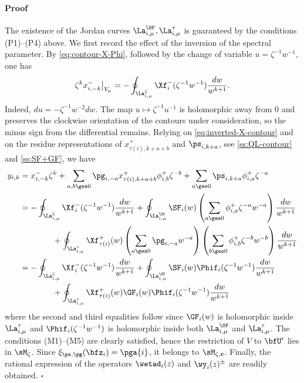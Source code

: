 \documentclass[reqno]{amsart}
\numberwithin{equation}{section}
\newenvironment{pf}{\medskip\paragraph{{\sc Proof}}}{\hfill$\square$\par\medskip}
\begin{document}
\begin{pf}
	The existence of the Jordan curves $\La^\SF_{i,\mu}, \La^\tau_{i,\mu}$ is guaranteed by the conditions (P1)--(P4) above.
	We first record the effect of the inversion of the spectral
	parameter. By \eqref{eq:contour-X-Phi}, followed by the change of
	variable $u=\zeta^{-1}w^{-1}$, one has
	\begin{equation}\label{eq:inverted-X-contour}
		\zeta^k x^-_{i,-k}\big|_{V_\mu}
		=
		-\oint_{\La^\zeta_{i,\mu}}
		\Xf_i^-(\zeta^{-1}w^{-1})\frac{dw}{w^{k+1}}.
	\end{equation}
	Indeed, $du=-\zeta^{-1}w^{-2}dw$. The map
	$u\mapsto\zeta^{-1}u^{-1}$ is holomorphic away from $0$ and
	preserves the clockwise orientation of the contours under
	consideration, so the minus sign from the differential remains.
	Relying on \eqref{eq:inverted-X-contour} and on the residue
	representations of $x^+_{\tau(i),k+a+b}$ and $\ps_{i,k+a}$, see
	\ref{ss:QL-contour} and \ref{ss:SF+GF}, we have
	\begin{align}
	y_{i,k}&=x_{i,-k}^-\zeta^k
+\sum_{a,b\ges0}\pg_{i,-a}x^+_{\tau(i),k+a+b}\phi^+_{i,b}\zeta^{-b}
+\sum_{a\ges0}\ps_{i,k+a}\phi^+_{i,a}\zeta^{-a}\\
	&=-\oint_{\La_{i,\mu}^\zeta}\Xf^-_{i}(\zeta^{-1}w^{-1})\frac{dw}{w^{k+1}}
+\oint_{\La_{i,\mu}^\SF}\SF_i(w)\left(\sum_{a\ges0}\phi_{i,a}^+\zeta^{-a}w^{-a}\right)\frac{dw}{w^{k+1}}\\
&\qquad\qquad+\oint_{\La_{i,\mu}^{\tau}}\Xf_{\tau(i)}^+(w)\left(\sum_{a\ges0}\pg_{i,-a}w^{-a}\right)\left(\sum_{b\ges0}\phi^+_{i,b}\zeta^{-b}w^{-b}\right)\frac{dw}{w^{k+1}}\\
	&=-\oint_{\La_{i,\mu}^\zeta}\Xf^-_{i}(\zeta^{-1}w^{-1})\frac{dw}{w^{k+1}}
+\oint_{\La_{i,\mu}^\SF}\SF_i(w)\Phif_i(\zeta^{-1}w^{-1})\frac{dw}{w^{k+1}}\\
&\qquad\qquad+\oint_{\La_{i,\mu}^{\tau}}\Xf_{\tau(i)}^+(w)\GF_i(w)\Phif_i(\zeta^{-1}w^{-1})\frac{dw}{w^{k+1}}	
\end{align}
where the second and third equalities follow since $\GF_i(w)$ is holomorphic inside $\La_{i,\mu}^{\tau}$ and $\Phif_i(\zeta^{-1}w^{-1})$ is holomorphic inside both $\La_{i,\mu}^\SF$ and $\La_{i,\mu}^{\tau}$. The conditions (M1)--(M5) are clearly satisfied, hence the restriction of $V$ to $\bfU^\imath$ lies in $\sM_\zeta$.
Since $\xi_{\ps,\pg}(\bfz_i)=\pga{i}$, it belongs to
$\sM_{\zeta,\mathbf c}$. Finally, the rational expression of the operators $\wetad_i(z)$ and $\wy_i(z)^\pm$ are readily obtained.
\end{pf}
\end{document}
